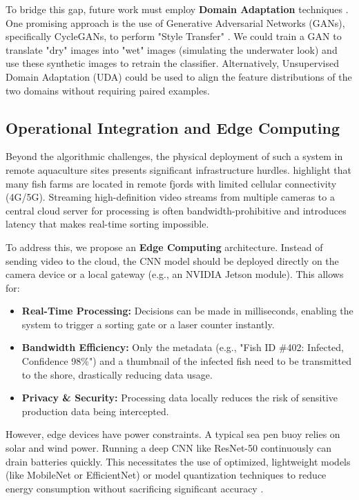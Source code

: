 \documentclass[12pt,a4paper]{article}
\begin{document}
To bridge this gap, future work must employ \textbf{Domain Adaptation} techniques \citep{10048777}. One promising approach is the use of Generative Adversarial Networks (GANs), specifically CycleGANs, to perform "Style Transfer" \citep{Shorten2019, MORENOBAREA2020113696}. We could train a GAN to translate "dry" images into "wet" images (simulating the underwater look) and use these synthetic images to retrain the classifier. Alternatively, Unsupervised Domain Adaptation (UDA) could be used to align the feature distributions of the two domains without requiring paired examples.

\subsection{Operational Integration and Edge Computing}
Beyond the algorithmic challenges, the physical deployment of such a system in remote aquaculture sites presents significant infrastructure hurdles. \cite{BIAZI2023102360} highlight that many fish farms are located in remote fjords with limited cellular connectivity (4G/5G). Streaming high-definition video streams from multiple cameras to a central cloud server for processing is often bandwidth-prohibitive and introduces latency that makes real-time sorting impossible.

To address this, we propose an \textbf{Edge Computing} architecture. Instead of sending video to the cloud, the CNN model should be deployed directly on the camera device or a local gateway (e.g., an NVIDIA Jetson module). This allows for:
\begin{itemize}
    \item \textbf{Real-Time Processing:} Decisions can be made in milliseconds, enabling the system to trigger a sorting gate or a laser counter instantly.
    \item \textbf{Bandwidth Efficiency:} Only the metadata (e.g., "Fish ID \#402: Infected, Confidence 98\%") and a thumbnail of the infected fish need to be transmitted to the shore, drastically reducing data usage.
    \item \textbf{Privacy \& Security:} Processing data locally reduces the risk of sensitive production data being intercepted.
\end{itemize}

However, edge devices have power constraints. A typical sea pen buoy relies on solar and wind power. Running a deep CNN like ResNet-50 continuously can drain batteries quickly. This necessitates the use of optimized, lightweight models (like MobileNet or EfficientNet) or model quantization techniques to reduce energy consumption without sacrificing significant accuracy \citep{CHEN2025109507, BIAZI2023102360}.
\end{document}
